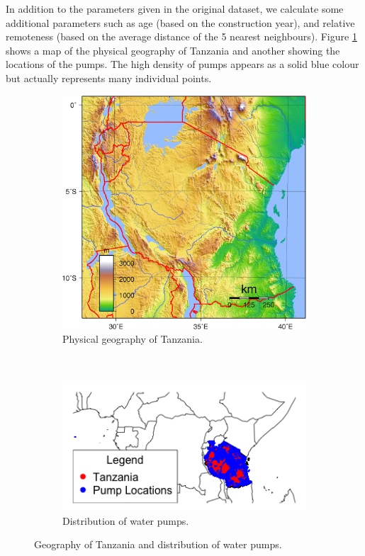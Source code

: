 \documentclass{article} %
\begin{document}
\begin{multicols}{2}
In addition to the parameters given in the original dataset, we calculate some additional parameters such as age (based on the construction year), and relative remoteness (based on the average distance of the 5 nearest neighbours). Figure \ref{fig:map-phys} shows a map of the physical geography of Tanzania and another showing the locations of the pumps. The high density of pumps appears as a solid blue colour but actually represents many individual points.

\begin{figure}
  \centering
  \begin{subfigure}[b]{0.5\textwidth}
    \centering
    \includegraphics[width=\textwidth]{figures/Tanzania}
    \caption{Physical geography of Tanzania.}
    \label{fig:map-phys}
  \end{subfigure}~\begin{subfigure}[b]{0.5\textwidth}
    \centering
    \includegraphics[width=\textwidth]{figures/PumpMap}
    \caption{Distribution of water pumps.}
    \label{fig:map-points}
  \end{subfigure}
  \caption{Geography of Tanzania and distribution of water pumps.}
  \label{fig:map}
\end{figure}


\end{multicols}
\end{document}
